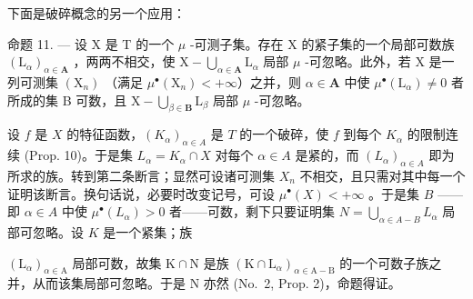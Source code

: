 下面是破碎概念的另一个应用：

命题 11. --- 设 X 是 T 的一个 \(\mu\) -可测子集。存在 X 的紧子集的一个局部可数族 \((\mathrm{L}_{\alpha})_{\alpha \in \mathbf{A}}\) ，两两不相交，使 \(\mathrm{X} - \bigcup_{\alpha \in \mathbf{A}} \mathrm{L}_{\alpha}\) 局部 \(\mu\) -可忽略。此外，若 X 是一列可测集 \((\mathrm{X}_n)\) （满足 \(\mu^{\bullet}(\mathrm{X}_n) < +\infty\)）之并，则 \(\alpha \in \mathbf{A}\) 中使 \(\mu^{\bullet}(\mathrm{L}_{\alpha}) \neq 0\) 者所成的集 B 可数，且 \(\mathrm{X} - \bigcup_{\beta \in \mathbf{B}} \mathrm{L}_{\beta}\) 局部 \(\mu\) -可忽略。

设 \(f\) 是 \(X\) 的特征函数，\((K_{\alpha})_{\alpha \in A}\) 是 \(T\) 的一个破碎，使 \(f\) 到每个 \(K_{\alpha}\) 的限制连续 (Prop. 10)。于是集 \(L_{\alpha} = K_{\alpha} \cap X\) 对每个 \(\alpha \in A\) 是紧的，而 \((L_{\alpha})_{\alpha \in A}\) 即为所求的族。转到第二条断言；显然可设诸可测集 \(X_{n}\) 不相交，且只需对其中每一个证明该断言。换句话说，必要时改变记号，可设 \(\mu^{\bullet}(X) < +\infty\) 。于是集 \(B\) ——即 \(\alpha \in A\) 中使 \(\mu^{\bullet}(L_{\alpha}) > 0\) 者——可数，剩下只要证明集 \(N = \bigcup_{\alpha \in A - B} L_{\alpha}\) 局部可忽略。设 \(K\) 是一个紧集；族

\((\mathrm{L}_{\alpha})_{\alpha\in\mathrm{A}}\) 局部可数，故集 \(\mathrm{K}\cap\mathrm{N}\) 是族 \((\mathrm{K}\cap\mathrm{L}_{\alpha})_{\alpha\in\mathrm{A}-\mathrm{B}}\) 的一个可数子族之并，从而该集局部可忽略。于是 \(\mathrm{N}\) 亦然 (No.~2, Prop. 2)，命题得证。

